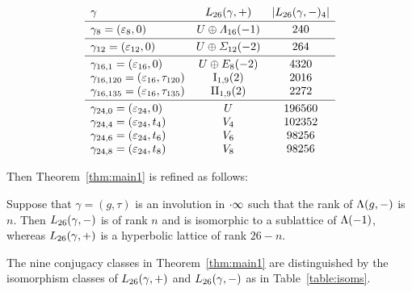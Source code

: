 \documentclass{amsart} %
\begin{document}
\begin{table}
\[
\begin{array}{lc c }
\gamma & \Lts(\gamma, +) & |\Lts(\gamma, -)_4|
\mystrutd{5pt} \\
\hline 
\gamma_{8}=(\vep_8, 0) & U\oplus \Lamsxtn(-1) & 240
\mystruthd{10pt}{5pt} \\
\hline
\gamma_{12}=(\vep_{12}, 0) & U\oplus \Sigmatwlv(-2) & 264
\mystruthd{10pt}{5pt} \\
\hline
\mystruth{10pt}
\gamma_{16, 1}=(\vep_{16}, 0) &U\oplus E_8(-2) &4320\\
\gamma_{16, 120} =(\vep_{16}, \tau_{120}) & \typeILat_{1, 9}(2) &2016\\
\gamma_{16, 135} =(\vep_{16}, \tau_{135}) & \typeIILat_{1, 9}(2) &2272
\mystrutd{5pt}\\
\hline
\mystruth{10pt}
\gamma_{24, 0}=( \vep_{24}, 0)& U &196560\\
\gamma_{24, 4}=(\vep_{24},t_4)& V_{4} & 102352 \\
\gamma_{24, 6}=( \vep_{24}, t_6) & V_{6} &98256\\
\gamma_{24, 8}=( \vep_{24}, t_8) & V_{8} &98256
\end{array}
\]
\vskip 10pt
\caption{$\Lts(\gamma, +)$ and $\Lts(\gamma,-)$}\label{table:isoms}
\end{table}
%
\par
Then Theorem~\ref{thm:main1} is refined as follows:
%
\begin{theorem}\label{thm:main2}
Suppose that $\gamma=(g, \tau)$ is an involution 
in $\cdot \infty$ such that the rank of $\Lambda(g, -)$ is $n$.
Then $\Lts(\gamma, -)$ is of rank $n$ and is isomorphic to a sublattice of $\Lambda (-1)$, 
whereas $\Lts(\gamma, +)$ is a hyperbolic lattice of rank $26-n$.
\par
The nine conjugacy classes in Theorem~\ref{thm:main1} are distinguished by 
the isomorphism classes of $\Lts(\gamma, +)$ and $\Lts(\gamma,-)$ as in Table~\ref{table:isoms}.
\end{theorem}
\end{document}
